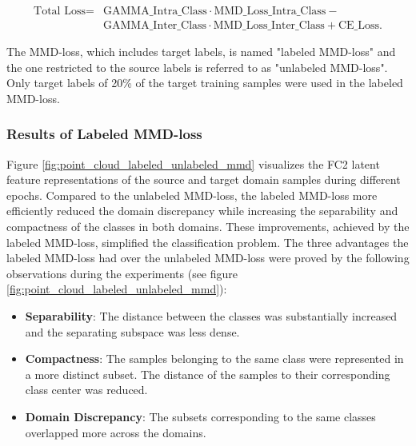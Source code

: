 \begin{equation}
\begin{split}
    \mbox{Total Loss} = & \mbox{GAMMA\_Intra\_Class}  \cdot \mbox{MMD\_Loss\_Intra\_Class} - \\
                              &\mbox{GAMMA\_Inter\_Class} \cdot \mbox{MMD\_Loss\_Inter\_Class} + \mbox{CE\_Loss}.
\end{split}
\end{equation}

The MMD-loss, which includes target labels, is named "labeled MMD-loss" and the one restricted to the source labels is referred to as "unlabeled MMD-loss". Only target labels of 20\% of the target training samples were used in the labeled MMD-loss.

\subsubsection{Results of Labeled MMD-loss}
Figure \ref{fig:point_cloud_labeled_unlabeled_mmd}
visualizes the FC2 latent feature representations of the source and target domain samples during different epochs. Compared to the unlabeled MMD-loss, the labeled MMD-loss more efficiently reduced the domain discrepancy while increasing the separability and compactness of the classes in both domains. These improvements, achieved by the labeled MMD-loss, simplified the classification problem. The three advantages the labeled MMD-loss had over the unlabeled MMD-loss were proved by the following observations during the experiments (see figure \ref{fig:point_cloud_labeled_unlabeled_mmd}):
\begin{itemize}
    \item \textbf{Separability}: The distance between the classes was substantially increased and the separating subspace was less dense.
    \item \textbf{Compactness}: The samples belonging to the same class were represented in a more distinct subset. The distance of the samples to their corresponding class center was reduced. 
    \item \textbf{Domain Discrepancy}: The subsets corresponding to the same classes overlapped more across the domains.
\end{itemize}

